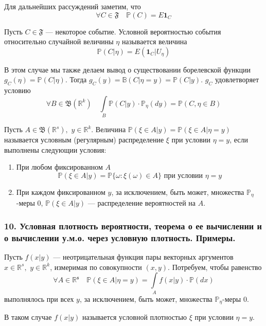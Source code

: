 \documentclass[12pt, russian]{article}
\begin{document}
\noindent Для дальнейших рассуждений заметим, что 
$$ \forall C \in \mathfrak{F} \quad \mathbb{P}(C) = E\mathbf{1}_C $$

\begin{mydef}
Пусть $C\in\mathfrak{F}$ --- некоторое событие. Условной вероятностью события относительно случайной величины $\eta$ называется величина
$$ \mathbb{P}(C|\eta) = E(\mathbf{1}_C|U_\eta)$$
\end{mydef}

В этом случае мы также делаем вывод о существовании борелевской функции $g_C(\eta) = \mathbb{P}(C|\eta)$. Тогда $g_C(y) = \mathbb{B}(C|\eta = y) = \mathbb{P}(C|y)$. $g_C$ удовлетворяет условию
$$ \forall B \in \mathfrak{B}(\mathbb{R}^k)\quad \int\limits_B{\mathbb{P}(C|y)\cdot\mathbb{P}_\eta(dy)} = \mathbb{P}(C, \eta\in B) $$

\begin{mydef}
Пусть $A\in\mathfrak{B}(\mathbb{R}^s),\,\,y\in\mathbb{R}^k$. Величина $\mathbb{P}(\xi\in A|y) = \mathbb{P}(\xi\in A|\eta = y)$ называется условным (регулярным) распределение $\xi$ при условии $\eta = y$, если выполнены следующии условия:
\begin{enumerate} 
\item При любом фиксированном $A$
$$ \mathbb{P}(\xi\in A|y) = \mathbb{P}\{\omega: \xi(\omega)\in A\} \text{ при условии } \eta = y $$
\item При каждом фиксированном $y$, за исключением, быть может, множества $\mathbb{P}_\eta$-меры 0, $\mathbb{P}(\xi\in A|y) $ --- распределение вероятностей на $A$.
\end{enumerate}
\end{mydef}

\newpage
\subsubsection*{10. Условная плотность вероятности, теорема о ее вычислении и о вычислении у.м.о. через условную плотность. Примеры.}

\begin{mydef}
Пусть $f(x|y)$ --- неотрицательная функция пары векторных аргументов $x\in\mathbb{R}^s,\,\,y\in\mathbb{R}^k$, измеримая по совокупности $(x, y)$. Потребуем, чтобы равенство
$$ \forall A \in \mathfrak{\mathbb{R}^s} \quad \mathbb{P}(\xi\in A|\eta = y) = \int\limits_A{f(x|y)\cdot\mathbb{P}(dx)}$$
выполнялось при всех $y$, за исключением, быть может, множества $\mathbb{P}_\eta$-меры 0.

\noindent В таком случае $f(x|y)$ называется условной плотностью $\xi$ при условии $\eta = y$.
\end{mydef}
\end{document}
